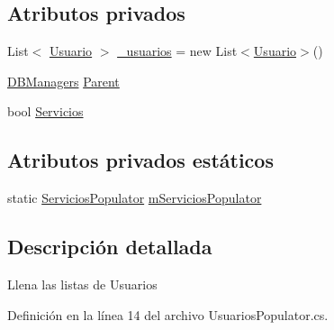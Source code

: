 \subsection*{Atributos privados}
\begin{DoxyCompactItemize}
\item 
List$<$ \hyperlink{class_proyecto___integrador__3_1_1_tipos_dato_1_1_usuario}{Usuario} $>$ \hyperlink{class_proyecto___integrador__3_1_1_d_b_managers_1_1_usuarios_populator_a4e30b143aa6f019cf45324d6192ea802}{\-\_\-usuarios} = new List$<$\hyperlink{class_proyecto___integrador__3_1_1_tipos_dato_1_1_usuario}{Usuario}$>$()
\item 
\hyperlink{class_proyecto___integrador__3_1_1_d_b_managers}{D\-B\-Managers} \hyperlink{class_proyecto___integrador__3_1_1_d_b_managers_1_1_usuarios_populator_a262c4a0f4d44e86a9030208d6cb6d26a}{Parent}
\item 
bool \hyperlink{class_proyecto___integrador__3_1_1_d_b_managers_1_1_usuarios_populator_a6986794b35361485b9507cdccf8e8abe}{Servicios}
\end{DoxyCompactItemize}
\subsection*{Atributos privados estáticos}
\begin{DoxyCompactItemize}
\item 
static \hyperlink{class_proyecto___integrador__3_1_1_d_b_managers_1_1_servicios_populator}{Servicios\-Populator} \hyperlink{class_proyecto___integrador__3_1_1_d_b_managers_1_1_usuarios_populator_a38322db59dd24df528d67958f931921e}{m\-Servicios\-Populator}
\end{DoxyCompactItemize}


\subsection{Descripción detallada}
Llena las listas de Usuarios 



Definición en la línea 14 del archivo Usuarios\-Populator.\-cs.



